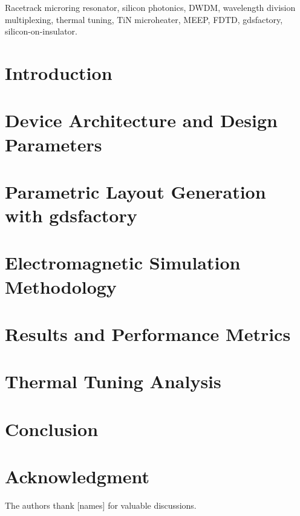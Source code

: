 \documentclass[journal]{IEEEtran}
\begin{document}
\begin{IEEEkeywords}
Racetrack microring resonator, silicon photonics, DWDM, wavelength division
multiplexing, thermal tuning, TiN microheater, MEEP, FDTD, gdsfactory,
silicon-on-insulator.
\end{IEEEkeywords}

\section{Introduction}
\label{sec:intro}


\section{Device Architecture and Design Parameters}
\label{sec:design}


\section{Parametric Layout Generation with gdsfactory}
\label{sec:layout}


\section{Electromagnetic Simulation Methodology}
\label{sec:simulation}


\section{Results and Performance Metrics}
\label{sec:results}


\section{Thermal Tuning Analysis}
\label{sec:thermal}


\section{Conclusion}
\label{sec:conclusion}


\section*{Acknowledgment}
The authors thank [names] for valuable discussions.



\end{document}
